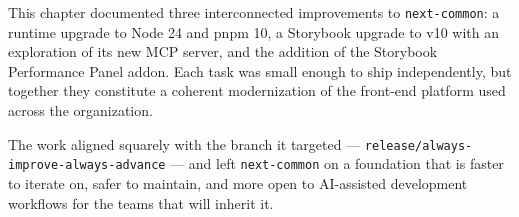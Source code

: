 This chapter documented three interconnected improvements to \texttt{next-common}: a runtime upgrade to Node 24 and pnpm 10, a Storybook upgrade to v10 with an exploration of its new MCP server, and the addition of the Storybook Performance Panel addon. Each task was small enough to ship independently, but together they constitute a coherent modernization of the front-end platform used across the organization.

The work aligned squarely with the branch it targeted --- \texttt{release/always-improve-always-advance} --- and left \texttt{next-common} on a foundation that is faster to iterate on, safer to maintain, and more open to AI-assisted development workflows for the teams that will inherit it.

\clearpage
